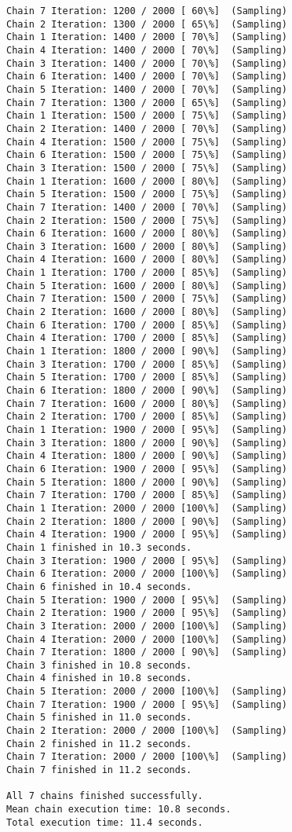 \documentclass[11pt]{article}
\begin{document}
\begin{Verbatim}[commandchars=\\\{\}]
Chain 7 Iteration: 1200 / 2000 [ 60\%]  (Sampling)
Chain 2 Iteration: 1300 / 2000 [ 65\%]  (Sampling)
Chain 1 Iteration: 1400 / 2000 [ 70\%]  (Sampling)
Chain 4 Iteration: 1400 / 2000 [ 70\%]  (Sampling)
Chain 3 Iteration: 1400 / 2000 [ 70\%]  (Sampling)
Chain 6 Iteration: 1400 / 2000 [ 70\%]  (Sampling)
Chain 5 Iteration: 1400 / 2000 [ 70\%]  (Sampling)
Chain 7 Iteration: 1300 / 2000 [ 65\%]  (Sampling)
Chain 1 Iteration: 1500 / 2000 [ 75\%]  (Sampling)
Chain 2 Iteration: 1400 / 2000 [ 70\%]  (Sampling)
Chain 4 Iteration: 1500 / 2000 [ 75\%]  (Sampling)
Chain 6 Iteration: 1500 / 2000 [ 75\%]  (Sampling)
Chain 3 Iteration: 1500 / 2000 [ 75\%]  (Sampling)
Chain 1 Iteration: 1600 / 2000 [ 80\%]  (Sampling)
Chain 5 Iteration: 1500 / 2000 [ 75\%]  (Sampling)
Chain 7 Iteration: 1400 / 2000 [ 70\%]  (Sampling)
Chain 2 Iteration: 1500 / 2000 [ 75\%]  (Sampling)
Chain 6 Iteration: 1600 / 2000 [ 80\%]  (Sampling)
Chain 3 Iteration: 1600 / 2000 [ 80\%]  (Sampling)
Chain 4 Iteration: 1600 / 2000 [ 80\%]  (Sampling)
Chain 1 Iteration: 1700 / 2000 [ 85\%]  (Sampling)
Chain 5 Iteration: 1600 / 2000 [ 80\%]  (Sampling)
Chain 7 Iteration: 1500 / 2000 [ 75\%]  (Sampling)
Chain 2 Iteration: 1600 / 2000 [ 80\%]  (Sampling)
Chain 6 Iteration: 1700 / 2000 [ 85\%]  (Sampling)
Chain 4 Iteration: 1700 / 2000 [ 85\%]  (Sampling)
Chain 1 Iteration: 1800 / 2000 [ 90\%]  (Sampling)
Chain 3 Iteration: 1700 / 2000 [ 85\%]  (Sampling)
Chain 5 Iteration: 1700 / 2000 [ 85\%]  (Sampling)
Chain 6 Iteration: 1800 / 2000 [ 90\%]  (Sampling)
Chain 7 Iteration: 1600 / 2000 [ 80\%]  (Sampling)
Chain 2 Iteration: 1700 / 2000 [ 85\%]  (Sampling)
Chain 1 Iteration: 1900 / 2000 [ 95\%]  (Sampling)
Chain 3 Iteration: 1800 / 2000 [ 90\%]  (Sampling)
Chain 4 Iteration: 1800 / 2000 [ 90\%]  (Sampling)
Chain 6 Iteration: 1900 / 2000 [ 95\%]  (Sampling)
Chain 5 Iteration: 1800 / 2000 [ 90\%]  (Sampling)
Chain 7 Iteration: 1700 / 2000 [ 85\%]  (Sampling)
Chain 1 Iteration: 2000 / 2000 [100\%]  (Sampling)
Chain 2 Iteration: 1800 / 2000 [ 90\%]  (Sampling)
Chain 4 Iteration: 1900 / 2000 [ 95\%]  (Sampling)
Chain 1 finished in 10.3 seconds.
Chain 3 Iteration: 1900 / 2000 [ 95\%]  (Sampling)
Chain 6 Iteration: 2000 / 2000 [100\%]  (Sampling)
Chain 6 finished in 10.4 seconds.
Chain 5 Iteration: 1900 / 2000 [ 95\%]  (Sampling)
Chain 2 Iteration: 1900 / 2000 [ 95\%]  (Sampling)
Chain 3 Iteration: 2000 / 2000 [100\%]  (Sampling)
Chain 4 Iteration: 2000 / 2000 [100\%]  (Sampling)
Chain 7 Iteration: 1800 / 2000 [ 90\%]  (Sampling)
Chain 3 finished in 10.8 seconds.
Chain 4 finished in 10.8 seconds.
Chain 5 Iteration: 2000 / 2000 [100\%]  (Sampling)
Chain 7 Iteration: 1900 / 2000 [ 95\%]  (Sampling)
Chain 5 finished in 11.0 seconds.
Chain 2 Iteration: 2000 / 2000 [100\%]  (Sampling)
Chain 2 finished in 11.2 seconds.
Chain 7 Iteration: 2000 / 2000 [100\%]  (Sampling)
Chain 7 finished in 11.2 seconds.

All 7 chains finished successfully.
Mean chain execution time: 10.8 seconds.
Total execution time: 11.4 seconds.

    \end{Verbatim}
\end{document}

